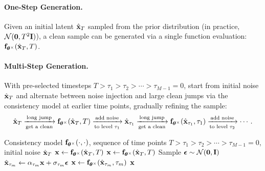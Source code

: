 \paragraph{One-Step Generation.} Given an initial latent $\hat{{\mathbf{x}}}_T$ sampled from the prior distribution (in practice,  $\mathcal{N}(\bm{0}, T^2{\mathbf{I}})$), a clean sample can be generated via a single function evaluation: ${\mathbf{f}}_{\bm{\theta}^\times}(\hat{{\mathbf{x}}}_T, T)$.

\paragraph{Multi-Step Generation.} With pre-selected timesteps 
$T>\tau_1 > \tau_2 > \cdots > \tau_{M-1}=0$, start from initial noise $\hat{{\mathbf{x}}}_T$ and alternate between noise injection and large clean jumps via the consistency model at earlier time points, gradually refining the sample:
\begin{align*}
    \hat{{\mathbf{x}}}_T \xrightarrow[\text{get a clean}]{\text{long jump}} {\mathbf{f}}_{\bm{\theta}^\times}(\hat{{\mathbf{x}}}_T, T)
    \xrightarrow[\text{to level $\tau_1$}]{\text{add noise}} \hat{{\mathbf{x}}}_{\tau_1}
    \xrightarrow[\text{get a clean}]{\text{long jump}} {\mathbf{f}}_{\bm{\theta}^\times}(\hat{{\mathbf{x}}}_{\tau_1}, \tau_1)
    \xrightarrow[\text{to level $\tau_2$}]{\text{add noise}} \cdots.
\end{align*}

\begin{algorithm}[thb!]
    {\small
        \caption{CM's Sampling with One-Step or Multi-Step Generation \label{alg:cm_sampling}}
    \begin{algorithmic}[1]
        \Require Consistency model ${\mathbf{f}}_{\bm{\theta}^\times}(\cdot, \cdot)$, sequence of time points $T>\tau_1 > \tau_2 > \cdots > \tau_{M-1}=0$, initial noise $\hat{{\mathbf{x}}}_T$
            \State ${\mathbf{x}} \leftarrow {\mathbf{f}}_{\bm{\theta}^\times}(\hat{{\mathbf{x}}}_T, T)$
        \Else
            \State ${\mathbf{x}} \leftarrow {\mathbf{f}}_{\bm{\theta}^\times}(\hat{{\mathbf{x}}}_T, T)$
                \State Sample $\bm{\epsilon} \sim \mathcal{N}(\bm{0}, \mathbf{I})$
                \State $\hat{{\mathbf{x}}}_{\tau_m} \leftarrow \alpha_{\tau_m}{\mathbf{x}} + \sigma_{\tau_m} \bm{\epsilon}$
                \State ${\mathbf{x}} \leftarrow {\mathbf{f}}_{\bm{\theta}^\times}(\hat{{\mathbf{x}}}_{\tau_m}, \tau_m)$
            \EndFor
        \EndIf
        \Ensure ${\mathbf{x}}$
    \end{algorithmic}
    }
\end{algorithm}














